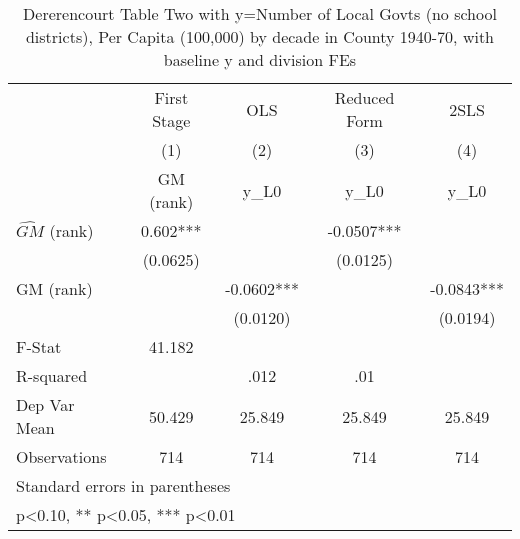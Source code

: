 \begin{table}[htbp]\centering
\def\sym#1{\ifmmode^{#1}\else\(^{#1}\)\fi}
\caption{Dererencourt Table Two with y=Number of Local Govts (no school districts), Per Capita (100,000) by decade in County 1940-70, with baseline y and division FEs}
\begin{tabular}{l*{4}{c}}
\toprule
                    & First Stage   &         OLS   &Reduced Form   &        2SLS   \\
                    &\multicolumn{1}{c}{(1)}&\multicolumn{1}{c}{(2)}&\multicolumn{1}{c}{(3)}&\multicolumn{1}{c}{(4)}\\
                    &\multicolumn{1}{c}{GM  (rank)}&\multicolumn{1}{c}{y\_L0}&\multicolumn{1}{c}{y\_L0}&\multicolumn{1}{c}{y\_L0}\\
\midrule
$\hat{GM}$ (rank)   &       0.602***&               &     -0.0507***&               \\
                    &    (0.0625)   &               &    (0.0125)   &               \\
\addlinespace
GM  (rank)          &               &     -0.0602***&               &     -0.0843***\\
                    &               &    (0.0120)   &               &    (0.0194)   \\
\midrule
F-Stat              &      41.182   &               &               &               \\
R-squared           &               &        .012   &         .01   &               \\
Dep Var Mean        &      50.429   &      25.849   &      25.849   &      25.849   \\
Observations        &         714   &         714   &         714   &         714   \\
\bottomrule
\multicolumn{5}{l}{\footnotesize Standard errors in parentheses}\\
\multicolumn{5}{l}{\footnotesize * p<0.10, ** p<0.05, *** p<0.01}\\
\end{tabular}
\end{table}
